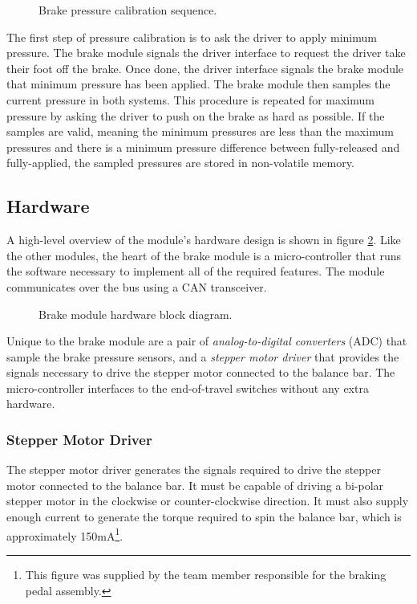 \begin{figure}[H]
	\centering
	
	\caption{Brake pressure calibration sequence.}
	\label{fig:brake_pressure_calibration_flow}
\end{figure}

The first step of pressure calibration is to ask the driver to apply minimum pressure. The brake module signals the driver interface to request the driver take their foot off the brake. Once done, the driver interface signals the brake module that minimum pressure has been applied. The brake module then samples the current pressure in both systems. This procedure is repeated for maximum pressure by asking the driver to push on the brake as hard as possible. If the samples are valid, meaning the minimum pressures are less than the maximum pressures and there is a minimum pressure difference between fully-released and fully-applied, the sampled pressures are stored in non-volatile memory.

\subsection{Hardware}

A high-level overview of the module's hardware design is shown in figure \ref{fig:brake_hardware_design_block}. Like the other modules, the heart of the brake module is a micro-controller that runs the software necessary to implement all of the required features. The module communicates over the bus using a CAN transceiver. 

\begin{figure}[H]
\centering

\caption{Brake module hardware block diagram.}
\label{fig:brake_hardware_design_block}
\end{figure}

Unique to the brake module are a pair of \emph{analog-to-digital converters} (ADC) that sample the brake pressure sensors, and a \emph{stepper motor driver} that provides the signals necessary to drive the stepper motor connected to the balance bar. The micro-controller  interfaces to the end-of-travel switches without any extra hardware.

\subsubsection{Stepper Motor Driver}

The stepper motor driver generates the signals required to drive the stepper motor connected to the balance bar. It must be capable of  driving a bi-polar stepper motor in the clockwise or counter-clockwise direction. It must also supply enough current to generate the torque required to spin the balance bar, which is approximately \unit{150}{mA}\footnote{This figure was supplied by the team member responsible for the braking pedal assembly.}.

